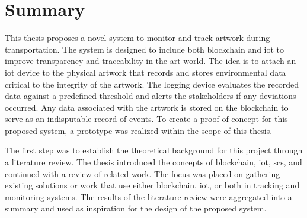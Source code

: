 

\section{Summary}
This thesis proposes a novel system to monitor and track artwork during transportation. The system is designed to include both blockchain and \gls{iot} to improve transparency and traceability in the art world. The idea is to attach an \gls{iot} device to the physical artwork that records and stores environmental data critical to the integrity of the artwork. The logging device evaluates the recorded data against a predefined threshold and alerts the stakeholders if any deviations occurred. Any data associated with the artwork is stored on the blockchain to serve as an indisputable record of events. To create a proof of concept for this proposed system, a prototype was realized within the scope of this thesis.

The first step was to establish the theoretical background for this project through a literature review. The thesis introduced the concepts of blockchain, \gls{iot}, \glspl{sc}, and continued with a review of related work. The focus was placed on gathering existing solutions or work that use either blockchain, \gls{iot}, or both in tracking and monitoring systems. The results of the literature review were aggregated into a summary and used as inspiration for the design of the proposed system.

